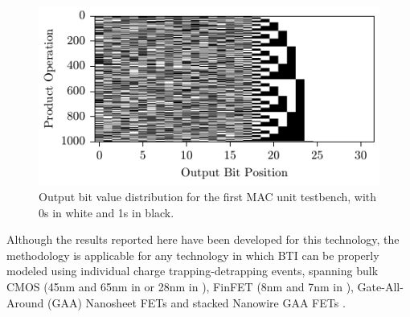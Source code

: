 \begin{figure}[!t]
    \includegraphics{images/ch2/MAC_bit_distribution.pdf}
    \caption{Output bit value distribution for the first MAC unit testbench, with 0s in white and 1s in black. }
    \label{fig:MAC_bit_dist}
\end{figure}
Although the results reported here have been developed for this technology, the methodology is applicable for any technology in which BTI can be properly modeled using individual charge trapping-detrapping events, spanning bulk CMOS (45nm and 65nm in \cite{procelDefectCentricPerspectiveChannel2015} or 28nm in \cite{kaczerDefectcentricPerspectiveDevice2015}), FinFET (8nm and 7nm in \cite{jiangTimeDependentVariability2021a}), Gate-All-Around (GAA) Nanosheet FETs \cite{choudhuryAnalysisBTISHE2020} and stacked Nanowire GAA FETs \cite{chasinBTIReliabilityTimedependent2017}. 

